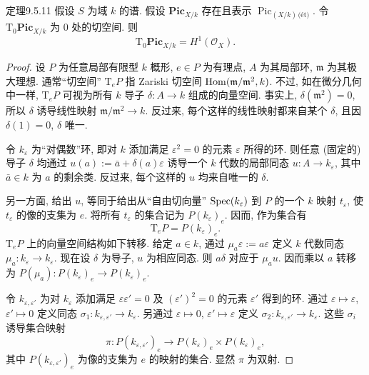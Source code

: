 \begin{origstatement}{定理}{9.5.11}\label{ch09s05:thm9.5.11}
假设 $S$ 为域 $k$ 的谱. 假设 $\mathbf{Pic}_{X/k}$ 存在且表示 $\operatorname{Pic}_{(X/k)\,\text{(\'{e}t)}}$. 令 $\mathrm T_0\mathbf{Pic}_{X/k}$ 为 $0$ 处的切空间. 则
\[
 \mathrm T_0\mathbf{Pic}_{X/k}=H^1(\mathcal O_X).
\]
\end{origstatement}
\begin{proof}
设 $P$ 为任意局部有限型 $k$ 概形, $e\in P$ 为有理点, $A$ 为其局部环, $\mathfrak m$ 为其极大理想. 通常“切空间” $\mathrm T_eP$ 指 Zariski 切空间 $\operatorname{Hom}(\mathfrak m/\mathfrak m^2,k)$. 不过, 如在微分几何中一样, $\mathrm T_eP$ 可视为所有 $k$ 导子 $\delta:A\to k$ 组成的向量空间. 事实上, $\delta(\mathfrak m^2)=0$, 所以 $\delta$ 诱导线性映射 $\mathfrak m/\mathfrak m^2\to k$. 反过来, 每个这样的线性映射都来自某个 $\delta$, 且因 $\delta(1)=0$, $\delta$ 唯一.

令 $k_\varepsilon$ 为“对偶数”环, 即对 $k$ 添加满足 $\varepsilon^2=0$ 的元素 $\varepsilon$ 所得的环. 则任意 (固定的) 导子 $\delta$ 均通过 $u(a):=\bar a+\delta(a)\varepsilon$ 诱导一个 $k$ 代数的局部同态 $u:A\to k_\varepsilon$, 其中 $\bar a\in k$ 为 $a$ 的剩余类. 反过来, 每个这样的 $u$ 均来自唯一的 $\delta$.

另一方面, 给出 $u$, 等同于给出从“自由切向量” $\operatorname{Spec}(k_\varepsilon)$ 到 $P$ 的一个 $k$ 映射 $t_\varepsilon$, 使 $t_\varepsilon$ 的像的支集为 $e$. 将所有 $t_\varepsilon$ 的集合记为 $P(k_\varepsilon)_e$. 因而, 作为集合有
\begin{equation}\tag{9.5.11.1}\label{ch09s05:eq9.5.11.1}
 \mathrm T_eP=P(k_\varepsilon)_e.
\end{equation}
$\mathrm T_eP$ 上的向量空间结构如下转移. 给定 $a\in k$, 通过 $\mu_a\varepsilon:=a\varepsilon$ 定义 $k$ 代数同态 $\mu_a:k_\varepsilon\to k_\varepsilon$. 现在设 $\delta$ 为导子, $u$ 为相应同态. 则 $a\delta$ 对应于 $\mu_a u$. 因而乘以 $a$ 转移为 $P(\mu_a):P(k_\varepsilon)_e\to P(k_\varepsilon)_e$.

令 $k_{\varepsilon,\varepsilon'}$ 为对 $k_\varepsilon$ 添加满足 $\varepsilon\varepsilon'=0$ 及 $(\varepsilon')^2=0$ 的元素 $\varepsilon'$ 得到的环. 通过 $\varepsilon\mapsto\varepsilon$, $\varepsilon'\mapsto0$ 定义同态 $\sigma_1:k_{\varepsilon,\varepsilon'}\to k_\varepsilon$. 另通过 $\varepsilon\mapsto0$, $\varepsilon'\mapsto\varepsilon$ 定义 $\sigma_2:k_{\varepsilon,\varepsilon'}\to k_\varepsilon$. 这些 $\sigma_i$ 诱导集合映射
\[
 \pi:P(k_{\varepsilon,\varepsilon'})_e\longrightarrow P(k_\varepsilon)_e\times P(k_\varepsilon)_e,
\]
其中 $P(k_{\varepsilon,\varepsilon'})_e$ 为像的支集为 $e$ 的映射的集合. 显然 $\pi$ 为双射.


\end{proof}
